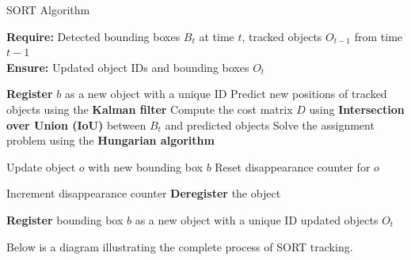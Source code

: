 \documentclass{CSSRforAfrica}
\begin{document}
\begin{algorithm}
	\caption{SORT Algorithm}
	\textbf{Require:} Detected bounding boxes $B_t$ at time $t$, tracked objects $O_{t-1}$ from time $t-1$ \\
	\textbf{Ensure:} Updated object IDs and bounding boxes $O_t$
	\begin{algorithmic}[1]
		\State \textbf{Register} $b$ as a new object with a unique ID
		\EndFor
		\Else
		\State Predict new positions of tracked objects using the \textbf{Kalman filter}
		\State Compute the cost matrix $D$ using \textbf{Intersection over Union (IoU)} between $B_t$ and predicted objects
		\State Solve the assignment problem using the \textbf{Hungarian algorithm}
		
		\State Update object $o$ with new bounding box $b$
		\State Reset disappearance counter for $o$
		\EndFor
		
		\State Increment disappearance counter
		\State \textbf{Deregister} the object
		\EndIf
		\EndFor
		
		\State \textbf{Register} bounding box $b$ as a new object with a unique ID
		\EndFor
		\EndIf
		\State \Return updated objects $O_t$
	\end{algorithmic}
\end{algorithm}

\newpage

Below is a diagram illustrating the complete process of SORT tracking.
\end{document}
